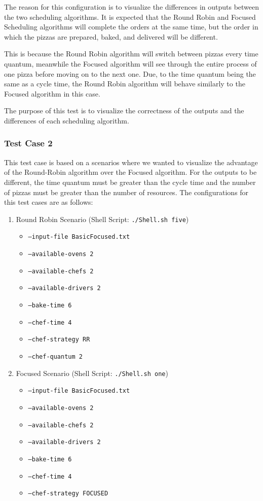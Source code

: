 \documentclass[conference]{IEEEtran}
\begin{document}
The reason for this configuration is to visualize the differences in outputs between the two scheduling algorithms. It is expected that the Round Robin and Focused Scheduling algorithms will complete the orders at the same time, but the order in which the pizzas are prepared, baked, and delivered will be different. 

This is because the Round Robin algorithm will switch between pizzas every time quantum, meanwhile the Focused algorithm will see through the entire process of one pizza before moving on to the next one. Due, to the time quantum being the same as a cycle time, the Round Robin algorithm will behave similarly to the Focused algorithm in this case. 

The purpose of this test is to visualize the correctness of the outputs and the differences of each scheduling algorithm.

\subsubsection{Test Case 2}
This test case is based on a scenarios where we wanted to visualize the advantage of the Round-Robin algorithm over the Focused algorithm. For the outputs to be different, the time quantum must be greater than the cycle time and the number of pizzas must be greater than the number of resources. The configurations for this test cases are as follows:
\begin{enumerate}
    \item Round Robin Scenario (Shell Script: \texttt{./Shell.sh five})
    \begin{itemize}
        \item \texttt{--input-file BasicFocused.txt}
        \item \texttt{--available-ovens 2}
        \item \texttt{--available-chefs 2} 
        \item \texttt{--available-drivers 2}
        \item \texttt{--bake-time 6}
        \item \texttt{--chef-time 4}
        \item \texttt{--chef-strategy RR}
        \item \texttt{--chef-quantum 2}
    \end{itemize}
    \item Focused Scenario (Shell Script: \texttt{./Shell.sh one})
    \begin{itemize}
        \item \texttt{--input-file BasicFocused.txt}
        \item \texttt{--available-ovens 2}
        \item \texttt{--available-chefs 2} 
        \item \texttt{--available-drivers 2}
        \item \texttt{--bake-time 6}
        \item \texttt{--chef-time 4}
        \item \texttt{--chef-strategy FOCUSED}
    \end{itemize}
\end{enumerate}
\end{document}
